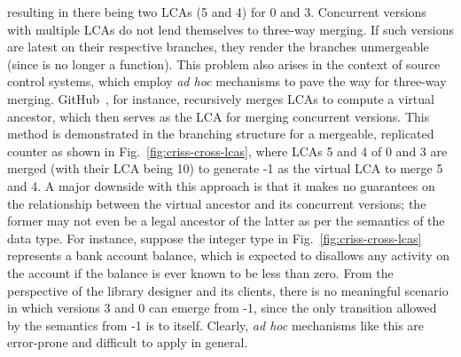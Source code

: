 resulting in there being two LCAs (5 and 4) for 0 and 3. 
Concurrent versions with multiple LCAs do not lend themselves to
three-way merging. If such versions are latest on their respective
branches, they render the branches unmergeable (since   is no
longer a function). This problem also arises in the context of source
control systems, which employ \emph{ad hoc} mechanisms to pave the way
for three-way merging.  GitHub~\cite{github}, for instance,
recursively merges LCAs to compute a virtual ancestor, which then
serves as the LCA for merging concurrent versions. This method is
demonstrated in the branching structure for a mergeable, replicated
counter as shown in Fig.~\ref{fig:criss-cross-lcas}, where LCAs 5 and
4 of 0 and 3 are merged (with their LCA being 10) to generate -1 as
the virtual LCA to merge 5 and 4. A major downside with this approach
is that it makes no guarantees on the relationship between the virtual
ancestor and its concurrent versions; the former may not even be a
legal ancestor of the latter as per the semantics of the data type.
For instance, suppose the integer type in
Fig.~\ref{fig:criss-cross-lcas} represents a bank account balance,
which is expected to disallows any activity on the account if the
balance is ever known to be less than zero.  From the perspective of
the library designer and its clients, there is no meaningful scenario
in which versions 3 and 0 can emerge from -1, since the only
transition allowed by the semantics from -1 is to itself.  Clearly,
\emph{ad hoc} mechanisms like this are error-prone and difficult to
apply in general.

